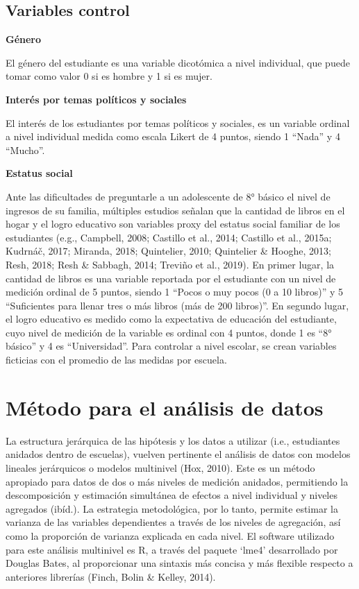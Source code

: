 \documentclass[12pt,twoside]{templates/facsothesis}
\begin{document}
\hypertarget{variables-control}{%
\subsection{Variables control}\label{variables-control}}

\textbf{Género}

El género del estudiante es una variable dicotómica a nivel individual, que puede tomar como valor 0 si es hombre y 1 si es mujer.
\newpage

\textbf{Interés por temas políticos y sociales}

El interés de los estudiantes por temas políticos y sociales, es un variable ordinal a nivel individual medida como escala Likert de 4 puntos, siendo 1 ``Nada'' y 4 ``Mucho''.

\textbf{Estatus social}

Ante las dificultades de preguntarle a un adolescente de 8° básico el nivel de ingresos de su familia, múltiples estudios señalan que la cantidad de libros en el hogar y el logro educativo son variables proxy del estatus social familiar de los estudiantes (e.g., Campbell, 2008; Castillo et al., 2014; Castillo et al., 2015a; Kudrnáč, 2017; Miranda, 2018; Quintelier, 2010; Quintelier \& Hooghe, 2013; Resh, 2018; Resh \& Sabbagh, 2014; Treviño et al., 2019). En primer lugar, la cantidad de libros es una variable reportada por el estudiante con un nivel de medición ordinal de 5 puntos, siendo 1 ``Pocos o muy pocos (0 a 10 libros)'' y 5 ``Suficientes para llenar tres o más libros (más de 200 libros)''. En segundo lugar, el logro educativo es medido como la expectativa de educación del estudiante, cuyo nivel de medición de la variable es ordinal con 4 puntos, donde 1 es ``8° básico'' y 4 es ``Universidad''. Para controlar a nivel escolar, se crean variables ficticias con el promedio de las medidas por escuela.

\hypertarget{muxe9todo-para-el-anuxe1lisis-de-datos}{%
\section{Método para el análisis de datos}\label{muxe9todo-para-el-anuxe1lisis-de-datos}}

La estructura jerárquica de las hipótesis y los datos a utilizar (i.e., estudiantes anidados dentro de escuelas), vuelven pertinente el análisis de datos con modelos lineales jerárquicos o modelos multinivel (Hox, 2010). Este es un método apropiado para datos de dos o más niveles de medición anidados, permitiendo la descomposición y estimación simultánea de efectos a nivel individual y niveles agregados (ibíd.). La estrategia metodológica, por lo tanto, permite estimar la varianza de las variables dependientes a través de los niveles de agregación, así como la proporción de varianza explicada en cada nivel. El software utilizado para este análisis multinivel es R, a través del paquete `lme4' desarrollado por Douglas Bates, al proporcionar una sintaxis más concisa y más flexible respecto a anteriores librerías (Finch, Bolin \& Kelley, 2014).
\end{document}
